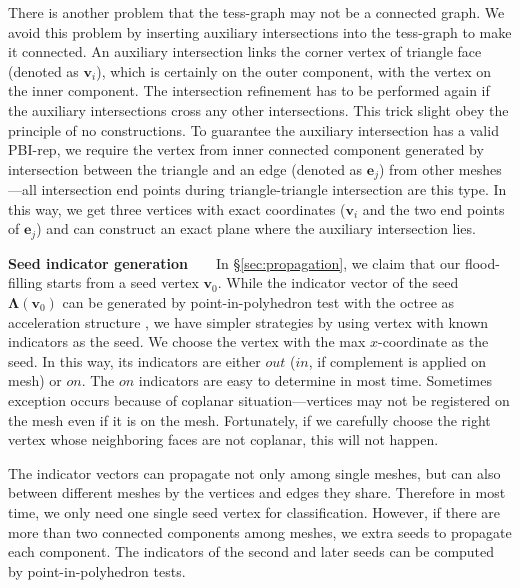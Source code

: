 \documentclass[10pt,journal,compsoc]{IEEEtran}
\begin{document}
\vspace{0.5em} There is another problem that the tess-graph may not be a connected graph. We avoid this problem by inserting auxiliary intersections into the tess-graph to make it connected. An auxiliary intersection links the corner vertex of triangle face (denoted as $\bm{v}_i$), which is certainly on the outer component, with the vertex on the inner component. The intersection refinement has to be performed again if the auxiliary intersections cross any other intersections. This trick slight obey the principle of no constructions. To guarantee the auxiliary intersection has a valid PBI-rep, we require the vertex from inner connected component generated by intersection between the triangle and an edge (denoted as $\bm{e}_j$) from other meshes---all intersection end points during triangle-triangle intersection are this type. In this way, we get three vertices with exact coordinates ($\bm{v}_i$ and the two end points of $\bm{e}_j$) and can construct an exact plane where the auxiliary intersection lies.

\vspace{0.5em}
\noindent\textbf{Seed indicator generation}~~~~In \S\ref{sec:propagation}, we claim that our flood-filling starts from a seed vertex $\bm{v}_0$. While the indicator vector of the seed $\bm{\Lambda}(\bm{v}_0)$ can be generated by point-in-polyhedron test \cite{ogayar2005point} with the octree as acceleration structure \cite{frisken2002simple}, we have simpler strategies by using vertex with known indicators as the seed. We choose the vertex with the max $x$-coordinate as the seed. In this way, its indicators are either $out$ ($in$, if complement is applied on mesh) or $on$. The $on$ indicators are easy to determine in most time. Sometimes exception occurs because of coplanar situation---vertices may not be registered on the mesh even if it is on the mesh. Fortunately, if we carefully choose the right vertex whose neighboring faces are not coplanar, this will not happen.

\vspace{0.5em} The indicator vectors can propagate not only among single meshes, but can also between different meshes by the vertices and edges they share. Therefore in most time, we only need one single seed vertex for classification. However, if there are more than two connected components among meshes, we extra seeds to propagate each component. The indicators of the second and later seeds can be computed by point-in-polyhedron tests.
\end{document}
